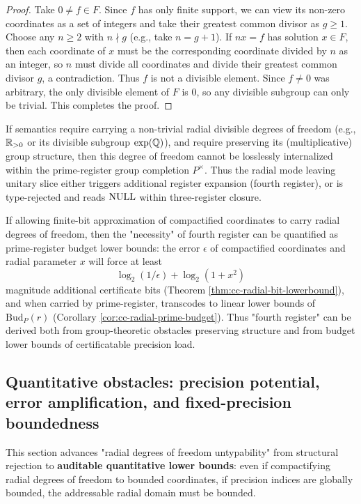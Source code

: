 \begin{proof}
Take $0\neq f\in F$. Since $f$ has only finite support, we can view its non-zero coordinates as a set of integers and take their greatest common divisor as $g\ge 1$. Choose any $n\ge 2$ with $n\nmid g$ (e.g., take $n=g+1$). If $nx=f$ has solution $x\in F$, then each coordinate of $x$ must be the corresponding coordinate divided by $n$ as an integer, so $n$ must divide all coordinates and divide their greatest common divisor $g$, a contradiction. Thus $f$ is not a divisible element. Since $f\neq 0$ was arbitrary, the only divisible element of $F$ is $0$, so any divisible subgroup can only be trivial. This completes the proof.\par
\end{proof}

\begin{corollary}\label{cor:fourth-register-divisible}
If semantics require carrying a non-trivial radial divisible degrees of freedom (e.g., $\mathbb{R}_{>0}$ or its divisible subgroup $\exp(\mathbb{Q})$), and require preserving its (multiplicative) group structure, then this degree of freedom cannot be losslessly internalized within the prime-register group completion $P^\times$. Thus the radial mode leaving unitary slice either triggers additional register expansion (fourth register), or is type-rejected and reads $\mathrm{NULL}$ within three-register closure.\par
\end{corollary}

\begin{remark}\label{rem:fourth-register-budget-link}
If allowing finite-bit approximation of compactified coordinates to carry radial degrees of freedom, then the "necessity" of fourth register can be quantified as prime-register budget lower bounds: the error $\epsilon$ of compactified coordinates and radial parameter $x$ will force at least
$$
\log_2(1/\epsilon)+\log_2(1+x^2)
$$
magnitude additional certificate bits (Theorem \ref{thm:cc-radial-bit-lowerbound}), and when carried by prime-register, transcodes to linear lower bounds of $\mathrm{Bud}_P(r)$ (Corollary \ref{cor:cc-radial-prime-budget}). Thus "fourth register" can be derived both from group-theoretic obstacles preserving structure and from budget lower bounds of certificatable precision load.\par
\end{remark}

\subsection{Quantitative obstacles: precision potential, error amplification, and fixed-precision boundedness}\label{subsec:fourth-register-quantitative}
This section advances "radial degrees of freedom untypability" from structural rejection to \textbf{auditable quantitative lower bounds}: even if compactifying radial degrees of freedom to bounded coordinates, if precision indices are globally bounded, the addressable radial domain must be bounded.\par

